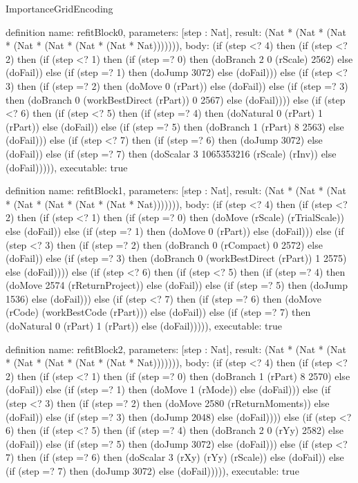 \begin{lexlean}{ImportanceGridEncoding}
\begin{semanticmodule}
definition{
  name: refitBlock0,
  parameters: [step : Nat],
  result: (Nat * (Nat * (Nat * (Nat * (Nat * (Nat * (Nat * Nat))))))),
  body: (if (step <? 4) then
      (if (step <? 2) then
      (if (step <? 1) then
      (if (step =? 0) then (doBranch 2 0 (rScale) 2562) else (doFail)) else
      (if (step =? 1) then (doJump 3072) else (doFail))) else
      (if (step <? 3) then
      (if (step =? 2) then (doMove 0 (rPart)) else (doFail)) else
      (if (step =? 3) then (doBranch 0 (workBestDirect (rPart)) 0 2567) else (doFail)))) else
      (if (step <? 6) then
      (if (step <? 5) then
      (if (step =? 4) then (doNatural 0 (rPart) 1 (rPart)) else (doFail)) else
      (if (step =? 5) then (doBranch 1 (rPart) 8 2563) else (doFail))) else
      (if (step <? 7) then
      (if (step =? 6) then (doJump 3072) else (doFail)) else
      (if (step =? 7) then (doScalar 3 1065353216 (rScale) (rInv)) else (doFail))))),
  executable: true
}

definition{
  name: refitBlock1,
  parameters: [step : Nat],
  result: (Nat * (Nat * (Nat * (Nat * (Nat * (Nat * (Nat * Nat))))))),
  body: (if (step <? 4) then
      (if (step <? 2) then
      (if (step <? 1) then
      (if (step =? 0) then (doMove (rScale) (rTrialScale)) else (doFail)) else
      (if (step =? 1) then (doMove 0 (rPart)) else (doFail))) else
      (if (step <? 3) then
      (if (step =? 2) then (doBranch 0 (rCompact) 0 2572) else (doFail)) else
      (if (step =? 3) then (doBranch 0 (workBestDirect (rPart)) 1 2575) else (doFail)))) else
      (if (step <? 6) then
      (if (step <? 5) then
      (if (step =? 4) then (doMove 2574 (rReturnProject)) else (doFail)) else
      (if (step =? 5) then (doJump 1536) else (doFail))) else
      (if (step <? 7) then
      (if (step =? 6) then (doMove (rCode) (workBestCode (rPart))) else (doFail)) else
      (if (step =? 7) then (doNatural 0 (rPart) 1 (rPart)) else (doFail))))),
  executable: true
}

definition{
  name: refitBlock2,
  parameters: [step : Nat],
  result: (Nat * (Nat * (Nat * (Nat * (Nat * (Nat * (Nat * Nat))))))),
  body: (if (step <? 4) then
      (if (step <? 2) then
      (if (step <? 1) then
      (if (step =? 0) then (doBranch 1 (rPart) 8 2570) else (doFail)) else
      (if (step =? 1) then (doMove 1 (rMode)) else (doFail))) else
      (if (step <? 3) then
      (if (step =? 2) then (doMove 2580 (rReturnMoments)) else (doFail)) else
      (if (step =? 3) then (doJump 2048) else (doFail)))) else
      (if (step <? 6) then
      (if (step <? 5) then
      (if (step =? 4) then (doBranch 2 0 (rYy) 2582) else (doFail)) else
      (if (step =? 5) then (doJump 3072) else (doFail))) else
      (if (step <? 7) then
      (if (step =? 6) then (doScalar 3 (rXy) (rYy) (rScale)) else (doFail)) else
      (if (step =? 7) then (doJump 3072) else (doFail))))),
  executable: true
}


\end{semanticmodule}
\end{lexlean}
